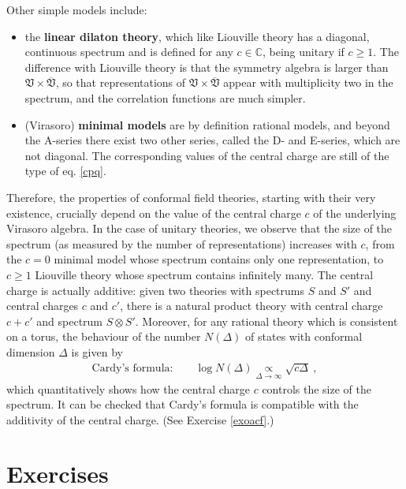 \documentclass[12pt, a4paper, notitlepage, twoside]{report}
\numberwithin{equation}{section}
\theoremstyle{break}
\begin{document}
Other simple models include:
\begin{itemize}
 \item the \textbf{\boldmath linear dilaton theory}, which like Liouville theory has a diagonal, continuous spectrum and is defined for any $c\in {\mathbb{C}}$, being unitary if $c\geq 1$.
The difference with Liouville theory is that the symmetry algebra is larger than $\mathfrak{V}\times \overline{\mathfrak{V}}$, so that representations of $\mathfrak{V}\times \overline{\mathfrak{V}}$ appear with multiplicity two in the spectrum, and the correlation functions are much simpler.
 \item 
(Virasoro) \textbf{\boldmath minimal models} are by definition rational models, and beyond the A-series there exist two other series, called the 
D- and E-series, which are not diagonal.
The corresponding values of the central charge are still of the type of eq. \eqref{cpq}.
\end{itemize}
Therefore,
the properties of conformal field theories, starting with their very existence, crucially depend on the value of the central charge $c$ of the underlying Virasoro algebra.
In the case of unitary theories, we observe that the size of the spectrum (as measured by the number of representations) increases with $c$, from the $c=0$ minimal model whose spectrum contains only one representation, to $c\geq 1$ Liouville theory whose spectrum contains infinitely many.
The central charge is actually additive: given two theories with spectrums $S$ and $S'$ and central charges $c$ and $c'$, there is a natural product theory with central charge $c+c'$ and spectrum $S\otimes S'$.
Moreover, for any rational theory which is consistent on a torus, 
the behaviour of the number $N(\Delta)$ of states with conformal dimension $\Delta$ is given by 
\begin{align}
\text{Cardy's formula:} \qquad \log N(\Delta) \underset{\Delta\to \infty}{\propto} \sqrt{c \Delta} \ ,
\label{nds}
\end{align}
which quantitatively shows how the central charge $c$ controls the size of the spectrum.
It can be checked that Cardy's formula is compatible with the additivity of the central charge. (See Exercise \ref{exoacf}.)

\section{Exercises}
\end{document}
